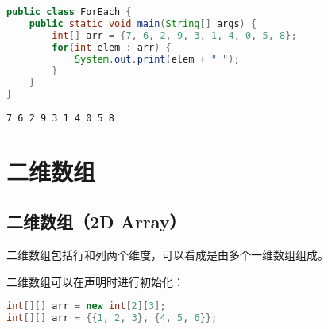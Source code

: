 \vspace{0.5cm}


\begin{lstlisting}[language=Java]
public class ForEach {
    public static void main(String[] args) {
        int[] arr = {7, 6, 2, 9, 3, 1, 4, 0, 5, 8};
        for(int elem : arr) {
            System.out.print(elem + " ");
        }
    }
}
\end{lstlisting}

\begin{tcolorbox}
	\begin{verbatim}
7 6 2 9 3 1 4 0 5 8
	\end{verbatim}
\end{tcolorbox}

\newpage

\section{二维数组}

\subsection{二维数组（2D Array）}

二维数组包括行和列两个维度，可以看成是由多个一维数组组成。

\begin{table}[H]
	\centering
\end{table}

二维数组可以在声明时进行初始化：

\vspace{-0.5cm}

\begin{lstlisting}[language=Java]
int[][] arr = new int[2][3];
int[][] arr = {{1, 2, 3}, {4, 5, 6}};
\end{lstlisting}

\vspace{0.5cm}


